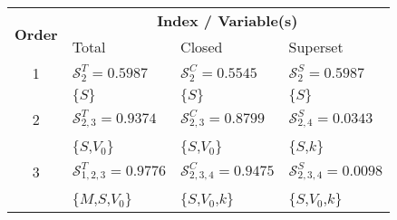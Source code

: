 
\begin{tabular}{|c|lll|}
   \hline
   \multicolumn{1}{|c|}{\multirow{2}{*}{\textbf{Order}}} & \multicolumn{3}{c|}{\textbf{Index / Variable(s)}} \\ \cline{2-4}
   \multicolumn{1}{|c|}{} & Total & Closed & Superset \\
   \hline \hline
    1 & $\mathcal{S}^T_{ 2 } = 0.5987$ & $\mathcal{S}^C_{ 2 }= 0.5545$ & $\mathcal{S}^S_{ 2 } = 0.5987$ \\ 
            & $\{$$S$$\}$ & $\{$$S$$\}$ & $\{$$S$$\}$ \\ \hline

    2 & $\mathcal{S}^T_{ 2,3 } = 0.9374$ & $\mathcal{S}^C_{ 2,3 }= 0.8799$ & $\mathcal{S}^S_{ 2,4 } = 0.0343$ \\ 
            & $\{$$S$,$V_0$$\}$ & $\{$$S$,$V_0$$\}$ & $\{$$S$,$k$$\}$ \\ \hline

    3 & $\mathcal{S}^T_{ 1,2,3 } = 0.9776$ & $\mathcal{S}^C_{ 2,3,4 }= 0.9475$ & $\mathcal{S}^S_{ 2,3,4 } = 0.0098$ \\ 
            & $\{$$M$,$S$,$V_0$$\}$ & $\{$$S$,$V_0$,$k$$\}$ & $\{$$S$,$V_0$,$k$$\}$ \\ \hline
    \end{tabular}